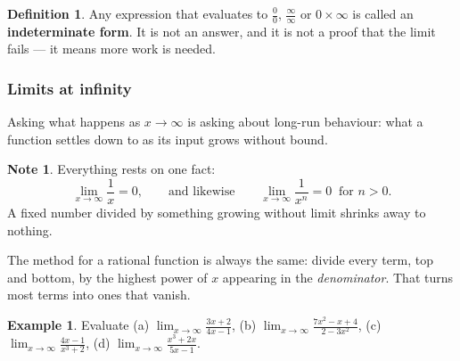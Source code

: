 \documentclass[11pt,a4paper]{article}
\theoremstyle{definition}
\newtheorem{definition}[thm]{Definition}
\newtheorem{example}[thm]{Example}
\newtheorem{note}[thm]{Note}
\begin{document}
\begin{definition}
Any expression that evaluates to $\frac{0}{0}$, $\frac{\infty}{\infty}$ or
$0\times\infty$ is called an \textbf{indeterminate form}. It is not an answer, and it is
not a proof that the limit fails --- it means more work is needed.
\end{definition}

\subsubsection{Limits at infinity}

Asking what happens as $x\to\infty$ is asking about long-run behaviour: what a function
settles down to as its input grows without bound.

\begin{note}
Everything rests on one fact:
$$\lim_{x\to\infty}\frac{1}{x}=0,\qquad\text{and likewise}\qquad
\lim_{x\to\infty}\frac{1}{x^n}=0\ \text{ for } n>0.$$
A fixed number divided by something growing without limit shrinks away to nothing.
\end{note}

The method for a rational function is always the same: divide every term, top and
bottom, by the highest power of $x$ appearing in the \emph{denominator}. That turns
most terms into ones that vanish.

\begin{example}
Evaluate \quad (a) $\displaystyle\lim_{x\to\infty}\frac{3x+2}{4x-1}$, \quad
(b) $\displaystyle\lim_{x\to\infty}\frac{7x^2-x+4}{2-3x^2}$, \quad
(c) $\displaystyle\lim_{x\to\infty}\frac{4x-1}{x^3+2}$, \quad
(d) $\displaystyle\lim_{x\to\infty}\frac{x^3+2x}{5x-1}$.
\end{example}
\end{document}
